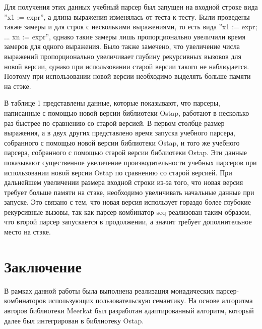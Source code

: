 \documentclass[conference]{IEEEtran}
\begin{document}
Для получения этих данных учебный парсер был запущен на входной строке вида ''x1 := {expr}'', а длина выражения изменялась от теста к тесту. Были проведены также замеры и для строк с несколькими выражениями, то есть вида ''x1 := {expr}; ... xn := {expr}'', однако такие замеры лишь пропорционально увеличили время замеров для одного выражения. Было также замечено, что увеличение числа выражений пропорционально увеличивает глубину рекурсивных вызовов для новой версии, однако при использовании старой версии такого не наблюдается. Поэтому при использовании новой версии необходимо выделять больше памяти на стэке.

В таблице 1 представлены данные, которые показывают, что парсеры, написанные с помощью новой версии библиотеки Ostap, работают в несколько раз быстрее по сравнению со старой версией. В первом столбце размер выражения, а в двух других представлено время запуска учебного парсера, собранного с помощью новой версии библиотеки Ostap, и того же учебного парсера, собранного с помощью старой версии библиотеки Ostap. Эти данные показывают существенное увеличение производительности учебных парсеров при использовании новой версии Ostap по сравнению со старой версией. При дальнейшем увеличении размера входной строки из-за того, что новая версия требует больше памяти на стэке, необходимо увеличивать начальные данные при запуске. Это связано с тем, что новая версия использует гораздо более глубокие рекурсивные вызовы, так как парсер-комбинатор seq реализован таким образом, что второй парсер запускается в продолжении, а значит требует дополнительное место на стэке.

\section{Заключение}

В рамках данной работы была выполнена реализация монадических парсер-комбинаторов использующих пользовательскую семантику. На основе алгоритма авторов библиотеки Meerkat был разработан адаптированный алгоритм, который далее был интегрирован в библиотеку Ostap. 
\end{document}
